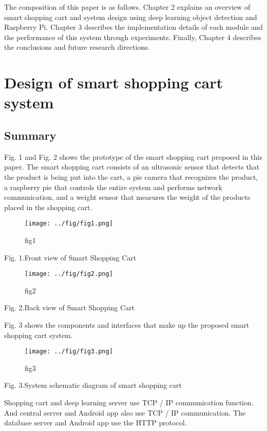 \documentclass[smallextended]{svjour3}       %
\begin{document}
The composition of this paper is as follows. Chapter 2 explains an
overview of smart shopping cart and system design using deep learning
object detection and Raspberry Pi. Chapter 3 describes the
implementation details of each module and the performance of this system
through experiments. Finally, Chapter 4 describes the conclusions and
future research directions.

\hypertarget{design-of-smart-shopping-cart-system}{%
\section{Design of smart shopping cart
system}\label{design-of-smart-shopping-cart-system}}

\hypertarget{summary}{%
\subsection{Summary}\label{summary}}

Fig. 1 and Fig. 2 shows the prototype of the smart shopping cart
proposed in this paper. The smart shopping cart consists of an
ultrasonic sensor that detects that the product is being put into the
cart, a pie camera that recognizes the product, a raspberry pie that
controls the entire system and performs network communication, and a
weight sensor that measures the weight of the products placed in the
shopping cart.

\begin{figure}
\centering
\texttt{[image: ../fig/fig1.png]}
\caption{fig1}
\end{figure}

Fig. 1.Front view of Smart Shopping Cart

\begin{figure}
\centering
\texttt{[image: ../fig/fig2.png]}
\caption{fig2}
\end{figure}

Fig. 2.Back view of Smart Shopping Cart

Fig. 3 shows the components and interfaces that make up the proposed
smart shopping cart system.

\begin{figure}
\centering
\texttt{[image: ../fig/fig3.png]}
\caption{fig3}
\end{figure}

Fig. 3.System schematic diagram of smart shopping cart

Shopping cart and deep learning server use TCP / IP communication
function. And central server and Android app also use TCP / IP
communication. The database server and Android app use the HTTP
protocol.
\end{document}
